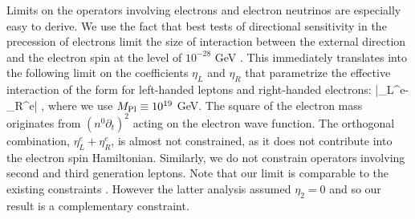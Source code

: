 Limits on the operators involving electrons and electron neutrinos
are especially easy to derive. We use the fact that best tests of
directional sensitivity in the precession of electrons limit the
size of interaction between the external direction and the
electron spin at the level of $10^{-28}$ GeV \cite{Heckel}. This
immediately translates into the following limit on the
coefficients $\eta_L$ and $\eta_R$ that parametrize the effective
interaction of the form  for left-handed leptons and
right-handed electrons:
%
\be |\eta_L^e-\eta_R^e|\la
{}, \label{leptl}
\ee
%
where we use $M_{\rm {\small Pl}} \equiv 10^{19}$ GeV. The square of the electron
mass originates from $(n^0\partial_t)^2$ acting on the electron
wave function. The orthogonal combination, $\eta_L^e+\eta_R^e$, is
almost not constrained, as it does not contribute into the
electron spin Hamiltonian. Similarly, we do not constrain
operators involving second and third generation leptons. Note that
our limit is comparable to the existing constraints \cite{Jacob}.
However the latter analysis assumed $\eta_2=0$ and so our result
is a complementary constraint.


